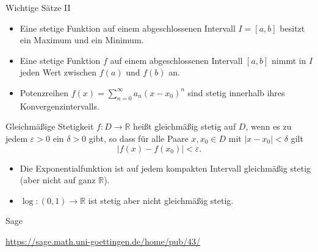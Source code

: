 \documentclass[notes=hide,hyperref={dvipdfmx,pdfpagelabels=false}]{beamer}
\begin{document}
\begin{frame}{Wichtige Sätze II}
\begin{itemize}
\item Eine stetige Funktion auf einem abgeschlossenen Intervall $I=[a,b]$
besitzt ein Maximum und ein Minimum.
\item Eine stetige Funktion $f$ auf einem abgeschlossenen  Intervall
$[a,b]$ nimmt in $I$ jeden Wert zwischen $f(a)$ und $f(b)$ an.
\item Potenzreihen $f(x)=\sum_{n=0}^\infty a_n (x-x_0)^n$ sind stetig
innerhalb ihres Konvergenzintervalls.
\end{itemize}
\end{frame}


\begin{frame}{Gleichmäßige Stetigkeit}
$f: D \rightarrow \mathbb{R}$ heißt {\color{red} gleichmäßig stetig auf $D$},
wenn es zu jedem $\varepsilon >0$ ein $\delta>0$ gibt, so dass für alle
Paare $x,x_0 \in D$ mit $|x - x_0|< \delta$ gilt
\[ | f(x)-f(x_0)| < \varepsilon. \]
\begin{itemize}
\item Die Exponentialfunktion ist auf jedem kompakten Intervall
gleichmäßig stetig (aber nicht auf ganz $\mathbb{R}$). 
\item $\log:(0,1) \rightarrow \mathbb{R}$ ist stetig aber nicht
gleichmäßig stetig.
\end{itemize}
\end{frame}


\begin{frame}{Sage}
    \begin{center}
        \url{https://sage.math.uni-goettingen.de/home/pub/43/}
    \end{center}
\end{frame}
\end{document}
